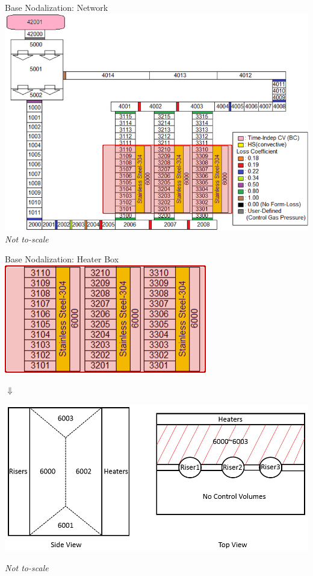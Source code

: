 \documentclass[10pt,t,xcolor=table]{UWMadBeamer}
\begin{document}
\begin{frame}{Base Nodalization: Network}
        \includegraphics[height=0.75\paperheight]{WRCCS_Nodalization}
        \hfill\textit{\scriptsize Not to-scale}
\end{frame}
\begin{frame}{Base Nodalization: Heater Box}
    \centering
    \includegraphics[width=0.3\paperwidth]{WRCCS_Nodalization-HeaterSection}
        
        {\Large $\Downarrow$}
        
    {
    \centering
    \includegraphics[width=0.65\paperwidth]{WRCCS_CavityNodalization}
    }
        
        \hfill\textit{\scriptsize Not to-scale}
\end{frame}
\end{document}
